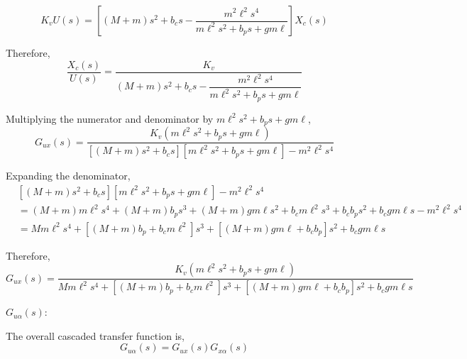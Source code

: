 \documentclass[11pt,a4paper]{article}
\begin{document}
\begin{equation*}
    K_{v} U(s) = \left[ \left( M + m \right) s^{2} + b_{c} s 
	- \frac{m^{2} \ell^{2} s^{4}}{m \ell^{2} s^{2} + b_{p} s + g m \ell}
    \right] X_{c}(s)
\end{equation*}

Therefore,
\begin{equation*}
    \frac{X_{c}(s)}{U(s)} = \frac{K_{v}}{\left( M + m \right) s^{2} + b_{c} s
    - \dfrac{m^{2} \ell^{2} s^{4}}{m \ell^{2} s^{2} + b_{p} s + g m \ell}}
\end{equation*}

Multiplying the numerator and denominator by $m\ell^{2}s^{2}+b_{p}s+gm\ell$,
\begin{equation*}
    G_{ux}(s) = \frac{K_{v} \left( m \ell^{2} s^{2} + b_{p} s + g m \ell\right)}
    {\left[ \left( M + m \right) s^{2} + b_{c} s \right] 
	\left[ m \ell^{2} s^{2} + b_{p} s + g m \ell \right] - m^{2} \ell^{2} s^{4}}
\end{equation*}

Expanding the denominator,
\begin{align*}
	&\left[ \left( M + m \right) s^{2} + b_{c} s \right]
    \left[ m \ell^{2} s^{2} + b_{p} s + g m \ell \right]
    -m^{2}\ell^{2}s^{4} \\  
    &= \left( M + m \right) m \ell^{2} s^{4}
    + \left( M + m \right) b_{p} s^{3}
    + \left( M + m \right) g m \ell s^{2} 
    + b_{c} m \ell^{2} s^{3} + b_{c} b_{p} s^{2} + b_{c} g m \ell s
    - m^{2} \ell^{2} s^{4} \\
	&= M m \ell^{2} s^{4} + \left[ \left( M + m \right) b_{p} + b_{c} m \ell^{2} 
	\right] s^{3} + \left[ \left( M + m \right) gm \ell + b_{c} b_{p} \right] 
	s^{2} + b_{c} g m \ell s
\end{align*}
	
Therefore,
\begin{equation}
    G_{ux}(s) = \frac{K_{v} \left( m \ell^{2} s^{2} + b_{p} s + g m \ell \right)}
    {M m \ell^{2} s^{4} + \left[ \left( M + m \right) b_{p} + b_{c} m \ell^{2} 
	\right] s^{3} + \left[ \left( M + m \right) g m \ell + b_{c} b_{p} \right]
	s^{2} + b_{c} g m \ell s} \tag{5}
\end{equation}

$G_{u\alpha}(s)$:

The overall cascaded transfer function is,
\begin{equation*}
    G_{u\alpha}(s) = G_{ux}(s) G_{x\alpha}(s)
\end{equation*}
\end{document}
